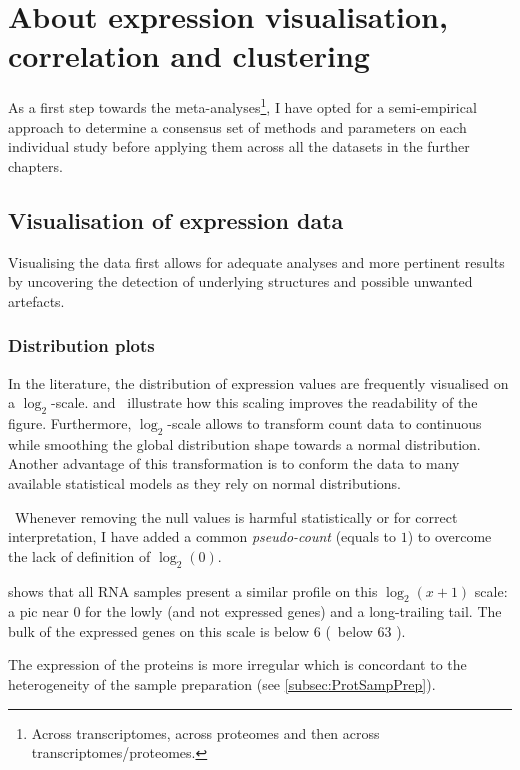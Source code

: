 \chapter{About expression visualisation, correlation and clustering}
\label{ch:expression}

As a first step towards the meta-analyses\footnote{Across transcriptomes, across
proteomes and then across transcriptomes/proteomes.},
I have opted for a semi-empirical approach to determine
a consensus set of methods and parameters on each individual study
before applying them across all the datasets in the further chapters.


\section{Visualisation of expression data}

Visualising the data first allows for adequate analyses
and more pertinent results by uncovering
the detection of underlying structures and possible unwanted artefacts.

\subsection{Distribution plots}\label{subsec:distribPlot}

In the literature, the distribution of expression values are frequently
visualised on a $\log_{2}$-scale.
 and~ illustrate how
this scaling improves the readability of the figure.
Furthermore, $\log_{2}$-scale allows to transform count data to continuous
while smoothing the global distribution shape towards a normal distribution.
Another advantage of this transformation is to conform the data to many available
statistical models as they rely on normal distributions.

\NB\ Whenever removing the null values is harmful statistically
or for correct interpretation,
I have added a common \emph{pseudo-count} (equals to $1$)
to overcome the lack of definition of $\log_{2}(0)$.

 shows that all \gls{RNA} samples present a similar
profile on this $\log_{2}(x+1)$ scale:
a pic near $0$ for the lowly (and not expressed genes) and a long-trailing tail.
The bulk of the expressed genes on this scale is below $6$ (\ie\ below 63 \FPKM).

The expression of the proteins is more irregular which is concordant to the
heterogeneity of the sample preparation (see \cref{subsec:ProtSampPrep}).


